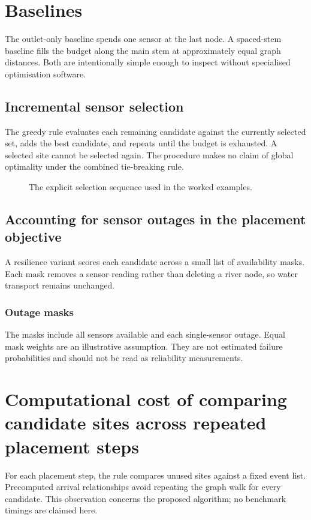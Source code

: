 \section{Baselines}\label{demo-placement-baselines}
The outlet-only baseline spends one sensor at the last node. A spaced-stem baseline fills the budget along the main stem at approximately equal graph distances. Both are intentionally simple enough to inspect without specialised optimisation software.
\subsection{Incremental sensor selection}\label{demo-placement-greedy}
The greedy rule evaluates each remaining candidate against the currently selected set, adds the best candidate, and repeats until the budget is exhausted. A selected site cannot be selected again. The procedure makes no claim of global optimality under the combined tie-breaking rule.
\begin{figure}[htbp]
\centering
{}
\caption{The explicit selection sequence used in the worked examples.}\label{demo-fig-selection}
\end{figure}
\subsection{Accounting for sensor outages in the placement objective}\label{demo-placement-outages}
A resilience variant scores each candidate across a small list of availability masks. Each mask removes a sensor reading rather than deleting a river node, so water transport remains unchanged.
\subsubsection{Outage masks}\label{demo-placement-masks}
The masks include all sensors available and each single-sensor outage. Equal mask weights are an illustrative assumption. They are not estimated failure probabilities and should not be read as reliability measurements.
\section{Computational cost of comparing candidate sites across repeated placement steps}\label{demo-placement-cost}
For each placement step, the rule compares unused sites against a fixed event list. Precomputed arrival relationships avoid repeating the graph walk for every candidate. This observation concerns the proposed algorithm; no benchmark timings are claimed here.
